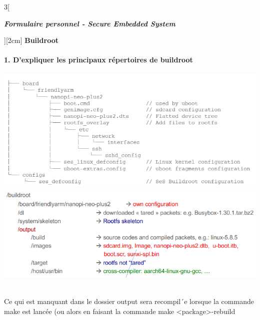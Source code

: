 \begin{multicols}{3}[\centerline{ \large\em \textbf{Formulaire personnel - Secure Embedded System}}][2cm]
{\Large \textbf{Buildroot}}
\paragraph*{1. D’expliquer les principaux répertoires de buildroot\\}
	
\begin{minipage}{\linewidth}
	\centering
    \includegraphics[width =0.8\columnwidth]{images/1.png}
    \includegraphics[width =0.8\columnwidth]{images/2.png}
\end{minipage}\\
Ce qui est manquant dans le dossier output sera recompil´e lorsque la commande make est lancée (ou alors en
faisant la commande make <package>-rebuild


\end{multicols}
